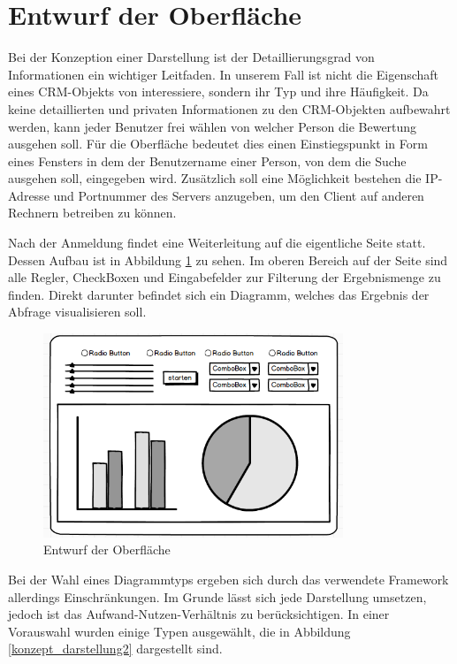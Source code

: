 \section{Entwurf der Oberfläche}
\label{ch:Konzeption:sec:Darstellungskonzepte}

Bei der Konzeption einer Darstellung ist der Detaillierungsgrad von Informationen ein wichtiger Leitfaden. In unserem Fall ist nicht die Eigenschaft eines CRM-Objekts von interessiere, sondern ihr Typ und ihre Häufigkeit. Da keine detaillierten und privaten Informationen zu den CRM-Objekten aufbewahrt werden, kann jeder Benutzer frei wählen von welcher Person die Bewertung ausgehen  soll. Für die Oberfläche bedeutet dies einen Einstiegspunkt in Form eines Fensters in dem der Benutzername einer Person, von dem die Suche ausgehen soll, eingegeben wird. Zusätzlich soll eine Möglichkeit bestehen die IP-Adresse und Portnummer des Servers anzugeben, um den Client auf anderen Rechnern betreiben zu können.

Nach der Anmeldung findet eine Weiterleitung auf die eigentliche Seite statt. Dessen Aufbau ist in Abbildung \ref{konzept_darstellung} zu sehen. Im oberen Bereich auf der Seite sind alle Regler, CheckBoxen und Eingabefelder zur Filterung der Ergebnismenge zu finden. Direkt darunter befindet sich ein Diagramm, welches das Ergebnis der Abfrage visualisieren soll.

\begin{figure}[htbp]
\centering
  \includegraphics[width=0.8\textwidth, width=0.8\textwidth]{pics/mockup.png}
\caption{Entwurf der Oberfläche}
\label{konzept_darstellung}
\end{figure} 

Bei der Wahl eines Diagrammtyps ergeben sich durch das verwendete Framework allerdings Einschränkungen. Im Grunde lässt sich jede Darstellung umsetzen, jedoch ist das Aufwand-Nutzen-Verhältnis zu berücksichtigen. In einer Vorauswahl wurden einige  Typen ausgewählt, die in Abbildung \ref{konzept_darstellung2} dargestellt sind. 

